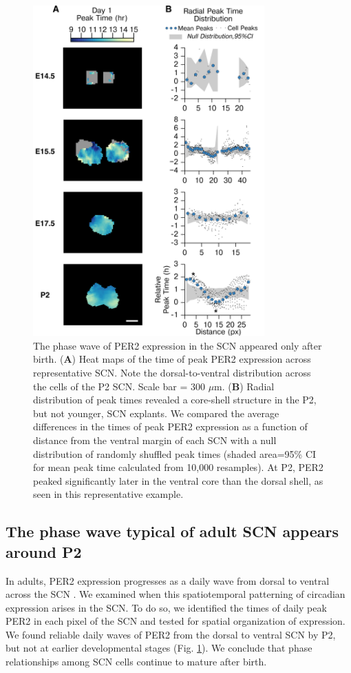\begin{figure}[p]
    \begin{center}
        \includegraphics[width=3.5in]{chap4/figures/Figure4.png}
    \end{center}
    \caption{\label{fig:vc4} The phase wave of PER2 expression in the SCN appeared only after birth. (\textbf{A}) Heat maps of the time of peak PER2 expression across representative SCN. Note the dorsal-to-ventral distribution across the cells of the P2 SCN. Scale bar = 300 $\mu$m. (\textbf{B}) Radial distribution of peak times revealed a core-shell structure in the P2, but not younger, SCN explants. We compared the average differences in the times of peak PER2 expression as a function of distance from the ventral margin of each SCN with a null distribution of randomly shuffled peak times (shaded area=95\% CI for mean peak time calculated from 10,000 resamples). At P2, PER2 peaked significantly later in the ventral core than the dorsal shell, as seen in this representative example. 
    }
\end{figure}


\subsection*{The phase wave typical of adult SCN appears around P2}


In adults, PER2 expression progresses as a daily wave from dorsal to ventral across the SCN \cite{Yan2002, Quintero2003, Yamaguchi2003, Evans2011}.
We examined when this spatiotemporal patterning of circadian expression arises in the SCN. To do so, we identified the times of daily peak PER2 in each pixel of the SCN and tested for spatial organization of expression.
We found reliable daily waves of PER2 from the dorsal to ventral SCN by P2, but not at earlier developmental stages (Fig. 
\ref{fig:vc4}).
We conclude that phase relationships among SCN cells continue to mature after birth.



